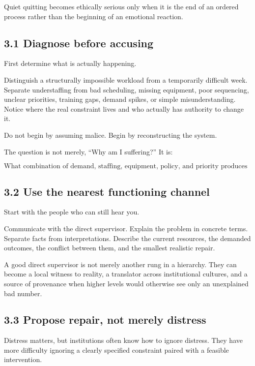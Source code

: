 \documentclass[11pt,oneside]{article}
\begin{document}
Quiet quitting becomes ethically serious only when it is the end of an
ordered process rather than the beginning of an emotional reaction.

\subsection{3.1 Diagnose before
accusing}\label{diagnose-before-accusing}

First determine what is actually happening.

Distinguish a structurally impossible workload from a temporarily
difficult week. Separate understaffing from bad scheduling, missing
equipment, poor sequencing, unclear priorities, training gaps, demand
spikes, or simple misunderstanding. Notice where the real constraint
lives and who actually has authority to change it.

Do not begin by assuming malice. Begin by reconstructing the system.

The question is not merely, ``Why am I suffering?'' It is:

\[
\text{What combination of demand, staffing, equipment, policy, and priority produces this outcome?}
\]

\subsection{3.2 Use the nearest functioning
channel}\label{use-the-nearest-functioning-channel}

Start with the people who can still hear you.

Communicate with the direct supervisor. Explain the problem in concrete
terms. Separate facts from interpretations. Describe the current
resources, the demanded outcomes, the conflict between them, and the
smallest realistic repair.

A good direct supervisor is not merely another rung in a hierarchy. They
can become a local witness to reality, a translator across institutional
cultures, and a source of provenance when higher levels would otherwise
see only an unexplained bad number.

\subsection{3.3 Propose repair, not merely
distress}\label{propose-repair-not-merely-distress}

Distress matters, but institutions often know how to ignore distress.
They have more difficulty ignoring a clearly specified constraint paired
with a feasible intervention.
\end{document}
